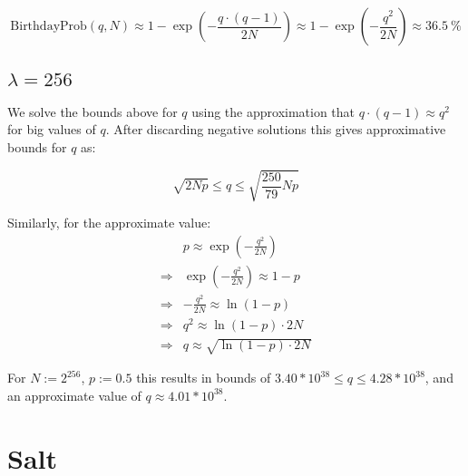\documentclass[a4paper]{scrreprt}
\begin{document}
\[
	\text{BirthdayProb}(q, N) \approx 1 - \exp(-\frac{q \cdot (q - 1)}{2
	N}) \approx 1 - \exp(-\frac{q^2}{2 N}) \approx \SI{36.5}{\percent}
\]

\subsection{$\lambda = 256$}

We solve the bounds above for $q$ using the approximation that $q \cdot (q-1)
\approx q^2$ for big values of $q$. After discarding negative solutions this
gives approximative bounds for $q$ as:


\[
	\sqrt{2 N p} \leq q \leq \sqrt{\frac{250}{79} N p}
\]

Similarly, for the approximate value:
\begin{align*}
	& p \approx \exp(- \frac{q^2}{2N}) \\
	\Rightarrow & \exp(- \frac{q^2}{2N}) \approx 1 - p \\
	\Rightarrow & -\frac{q^2}{2N} \approx \ln(1 - p) \\
	\Rightarrow & q^2 \approx \ln(1 - p) \cdot 2N \\
	\Rightarrow & q \approx \sqrt{\ln(1 - p) \cdot 2N}
\end{align*}

For $N := 2^{256}$, $p := 0.5$ this results in bounds of $3.40 * 10^{38} \leq q
\leq 4.28 * 10^{38}$, and an approximate value of $q \approx 4.01 * 10^{38}$.


\section{Salt}
\end{document}
